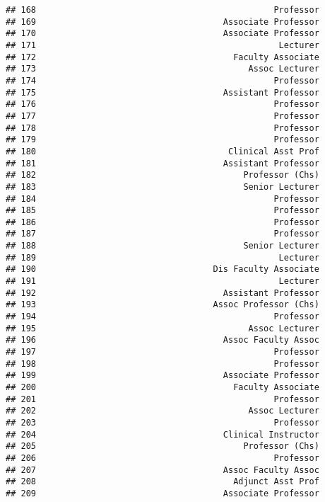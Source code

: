 \documentclass[
]{article}
\begin{document}
\begin{verbatim}
## 168                                               Professor
## 169                                     Associate Professor
## 170                                     Associate Professor
## 171                                                Lecturer
## 172                                       Faculty Associate
## 173                                          Assoc Lecturer
## 174                                               Professor
## 175                                     Assistant Professor
## 176                                               Professor
## 177                                               Professor
## 178                                               Professor
## 179                                               Professor
## 180                                      Clinical Asst Prof
## 181                                     Assistant Professor
## 182                                         Professor (Chs)
## 183                                         Senior Lecturer
## 184                                               Professor
## 185                                               Professor
## 186                                               Professor
## 187                                               Professor
## 188                                         Senior Lecturer
## 189                                                Lecturer
## 190                                   Dis Faculty Associate
## 191                                                Lecturer
## 192                                     Assistant Professor
## 193                                   Assoc Professor (Chs)
## 194                                               Professor
## 195                                          Assoc Lecturer
## 196                                     Assoc Faculty Assoc
## 197                                               Professor
## 198                                               Professor
## 199                                     Associate Professor
## 200                                       Faculty Associate
## 201                                               Professor
## 202                                          Assoc Lecturer
## 203                                               Professor
## 204                                     Clinical Instructor
## 205                                         Professor (Chs)
## 206                                               Professor
## 207                                     Assoc Faculty Assoc
## 208                                       Adjunct Asst Prof
## 209                                     Associate Professor

\end{verbatim}
\end{document}
